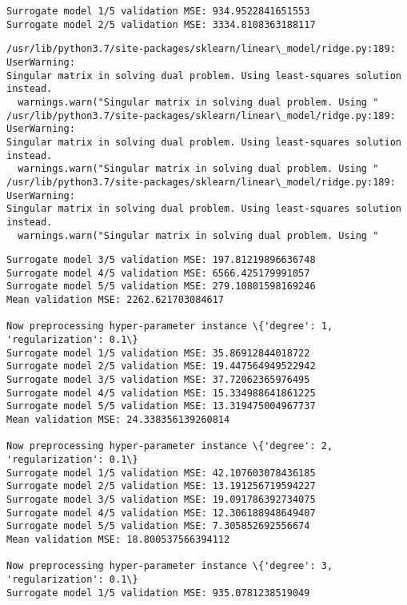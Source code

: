 \documentclass[11pt]{article}
\begin{document}
    \begin{Verbatim}[commandchars=\\\{\}]
Surrogate model 1/5 validation MSE: 934.9522841651553
Surrogate model 2/5 validation MSE: 3334.8108363188117
    \end{Verbatim}

    \begin{Verbatim}[commandchars=\\\{\}]
/usr/lib/python3.7/site-packages/sklearn/linear\_model/ridge.py:189: UserWarning:
Singular matrix in solving dual problem. Using least-squares solution instead.
  warnings.warn("Singular matrix in solving dual problem. Using "
/usr/lib/python3.7/site-packages/sklearn/linear\_model/ridge.py:189: UserWarning:
Singular matrix in solving dual problem. Using least-squares solution instead.
  warnings.warn("Singular matrix in solving dual problem. Using "
/usr/lib/python3.7/site-packages/sklearn/linear\_model/ridge.py:189: UserWarning:
Singular matrix in solving dual problem. Using least-squares solution instead.
  warnings.warn("Singular matrix in solving dual problem. Using "
    \end{Verbatim}

    \begin{Verbatim}[commandchars=\\\{\}]
Surrogate model 3/5 validation MSE: 197.81219896636748
Surrogate model 4/5 validation MSE: 6566.425179991057
Surrogate model 5/5 validation MSE: 279.10801598169246
Mean validation MSE: 2262.621703084617

Now preprocessing hyper-parameter instance \{'degree': 1, 'regularization': 0.1\}
Surrogate model 1/5 validation MSE: 35.86912844018722
Surrogate model 2/5 validation MSE: 19.447564949522942
Surrogate model 3/5 validation MSE: 37.72062365976495
Surrogate model 4/5 validation MSE: 15.334988641861225
Surrogate model 5/5 validation MSE: 13.319475004967737
Mean validation MSE: 24.338356139260814

Now preprocessing hyper-parameter instance \{'degree': 2, 'regularization': 0.1\}
Surrogate model 1/5 validation MSE: 42.107603078436185
Surrogate model 2/5 validation MSE: 13.191256719594227
Surrogate model 3/5 validation MSE: 19.091786392734075
Surrogate model 4/5 validation MSE: 12.306188948649407
Surrogate model 5/5 validation MSE: 7.305852692556674
Mean validation MSE: 18.800537566394112

Now preprocessing hyper-parameter instance \{'degree': 3, 'regularization': 0.1\}
Surrogate model 1/5 validation MSE: 935.0781238519049
    \end{Verbatim}
\end{document}
